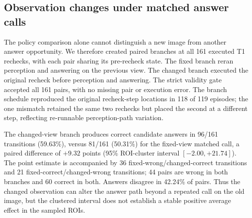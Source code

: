 \begin{table}[!t]
\centering\small
\caption{Shortcut controls and image-aware operating points on the frozen final set. S0 uses a development-fitted task majority and is deterministic ($n=160$); all other rows use three aligned repeats ($n=480$). S1 receives question text, choices, and task type; S2 additionally receives permitted runtime metadata.}
\label{tab:shortcut-controls}
\end{table}

\subsection{Observation changes under matched answer calls}
The policy comparison alone cannot distinguish a new image from another answer opportunity. We therefore created paired branches at all 161 executed T1 rechecks, with each pair sharing its pre-recheck state. The fixed branch reran perception and answering on the previous view. The changed branch executed the original recheck before perception and answering. The strict validity gate accepted all 161 pairs, with no missing pair or execution error. The branch schedule reproduced the original recheck-step locations in 118 of 119 episodes; the one mismatch retained the same two rechecks but placed the second at a different step, reflecting re-runnable perception-path variation.

The changed-view branch produces correct candidate answers in 96/161 transitions (59.63\%), versus 81/161 (50.31\%) for the fixed-view matched call, a paired difference of $+9.32$ points (95\% ROI-cluster interval $[-2.00,+21.74]$). The point estimate is accompanied by 36 fixed-wrong/changed-correct transitions and 21 fixed-correct/changed-wrong transitions; 44 pairs are wrong in both branches and 60 correct in both. Answers disagree in 42.24\% of pairs. Thus the changed observation can alter the answer path beyond a repeated call on the old image, but the clustered interval does not establish a stable positive average effect in the sampled ROIs.

